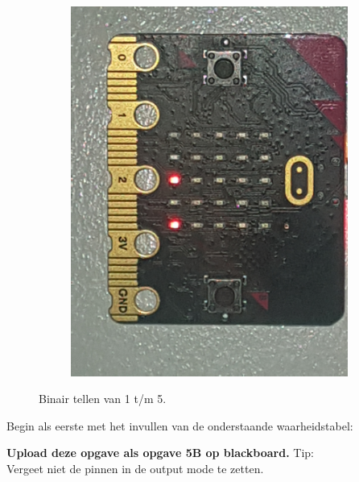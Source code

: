 \begin{figure}[h!]
\begin{subfigure}[b]{0.19\textwidth}
           \includegraphics[width=.98\linewidth]{figuren/matrix/mVijf}
       \end{subfigure}	
       \caption{Binair tellen van 1 t/m 5.}
       \label{fig:binCount}
	\end{figure}
Begin als eerste met het invullen van de onderstaande waarheidstabel:
\begin{table}[h!]
\end{table}

\textbf{Upload deze opgave als opgave 5B op blackboard.}
Tip:\\
Vergeet niet de pinnen in de output mode te zetten.

